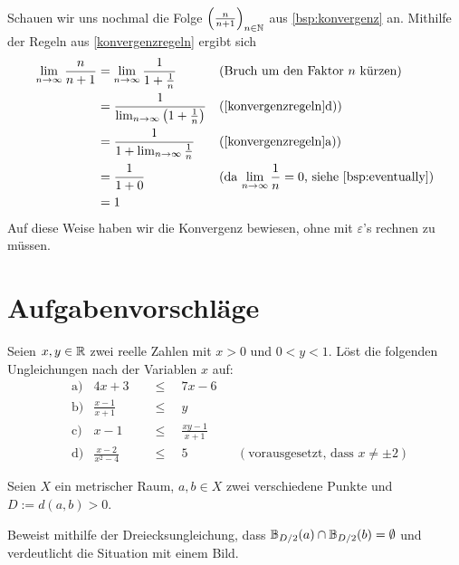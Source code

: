 \begin{bsp}
    Schauen wir uns nochmal die Folge $\left(\frac{n}{n+1}\right)_{n\in \mathbb N}$ aus \cref{bsp:konvergenz} an. Mithilfe der Regeln aus \cref{konvergenzregeln} ergibt sich
    \begin{align*}
        \lim_{n\to\infty} \frac{n}{n+1} & = \lim_{n\to\infty} \frac{1}{1+\frac{1}{n}} && (\text{Bruch um den Faktor $n$ kürzen}) \\
        & = \frac{1}{\lim_{n\to\infty} \left(1+\frac{1}{n}\right)} && (\text{\cref{konvergenzregeln}d)}) \\
        & = \frac{1}{1+\lim_{n\to\infty} \frac{1}{n}} && (\text{\cref{konvergenzregeln}a)}) \\
        & = \frac{1}{1+0} && (\text{da $\lim_{n\to\infty} \frac{1}{n}=0$, siehe \cref{bsp:eventually}}) \\
        & = 1
    \end{align*}
    Auf diese Weise haben wir die Konvergenz bewiesen, ohne mit $\varepsilon$'s rechnen zu müssen.
\end{bsp}





\clearpage
\section{Aufgabenvorschläge}


\begin{aufg}
    Seien $x,y\in \mathbb R$ zwei reelle Zahlen mit $x>0$ und $0<y<1$. Löst die folgenden Ungleichungen nach der Variablen $x$ auf:
    \begin{align*}
        &\text{a)} & 4x + 3 \quad&\le\quad 7x-6 \\[0.5em]
        &\text{b)} & \frac{x-1}{x+1} \quad&\le\quad y \\[0.5em]
        &\text{c)} & x-1 \quad&\le\quad \frac{xy-1}{x+1} \\[0.5em]
        &\text{d)} & \frac{x-2}{x^2-4} \quad&\le\quad 5 && (\text{vorausgesetzt, dass $x\neq \pm 2$})
    \end{align*}
\end{aufg}


\begin{aufg}
    Seien $X$ ein metrischer Raum, $a,b\in X$ zwei verschiedene Punkte und $D:=d(a,b)>0$.
    
    Beweist mithilfe der Dreiecksungleichung, dass $\mathbb B_{D/2}(a)\cap \mathbb B_{D/2}(b)=\emptyset$ und verdeutlicht die Situation mit einem Bild.
\end{aufg}


